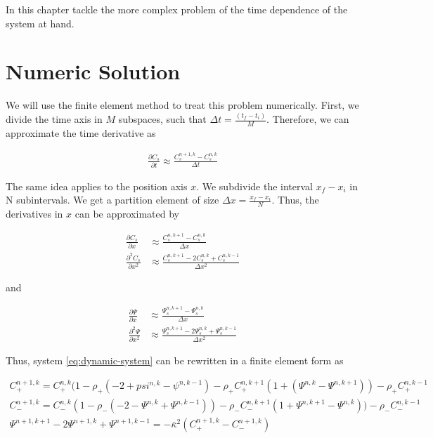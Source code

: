 In this chapter tackle  the more complex problem of the time dependence of the system at hand.


\section{Numeric Solution}

We will use the finite element method to treat this problem numerically. First, we divide the time axis in $M$ subspaces, such that $\Delta t = \frac{(t_f- t_i)}{M}$. Therefore, we can approximate the time derivative as

\begin{align}
\frac{\partial C_s}{\partial t} \approx \frac{C^{n+1, k}_s - C^{n, k}_s}{\Delta t}
\end{align}

The same idea applies to the position axis $x$. We subdivide the interval $x_f - x_i$ in N subintervals. We get a partition element of size $\Delta x = \frac{x_f - x_i}{N}$. Thus, the derivatives in $x$ can be approximated by

\begin{align}
\frac{\partial C_s}{\partial x} &\approx \frac{C^{n, k+1}_s - C^{n, k}_s}{\Delta x}\\
\frac{\partial^2 C_s}{\partial x^2} &\approx \frac{C^{n, k + 1}_s - 2C^{n, k}_s + C^{n, k-1}_s}{\Delta x^2}
\end{align}

and

\begin{align}
\frac{\partial \Psi}{\partial x} &\approx \frac{\Psi^{n, k+1}_s - \Psi^{n, k}_s}{\Delta x}\\
\frac{\partial^2 \Psi}{\partial x^2} &\approx \frac{\Psi^{n, k + 1}_s - 2\Psi^{n, k}_s + \Psi^{n, k-1}_s}{\Delta x^2}
\end{align}

Thus, system \ref{eq:dynamic-system} can be rewritten in a finite element form as

\begin{align}
C_+^{n+1,k} = C_+^{n,k}(1-\rho_+ (-2+psi^{n,k}-\psi^{n,k-1})- \rho_+ C_+^{n,k+1}(1 + (\Psi^{n,k}-\Psi^{n,k+1})) - \rho_+C_+^{n,k-1}& \\
C_-^{n+1,k} = C_-^{n,k}(1-\rho_-(-2-\Psi^{n,k}+\Psi^{n,k-1})) - \rho_- C_-^{n, k+1}(1+\Psi^{n,k+1}-\Psi^{n,k})) - \rho_- C_-^{n,k-1}& \\
 \Psi^{n+1,k+1}  - 2\Psi^{n+1,k} +\Psi^{n+1,k-1}  = -\bar{\kappa}^2 (C_+^{n+1,k} - C_-^{n+1,k})&
\label{eq:alg-eq}
\end{align}

